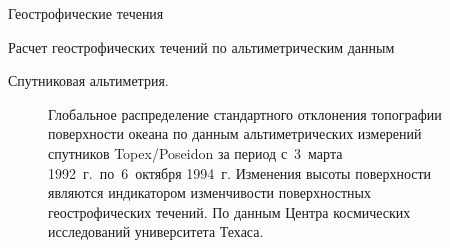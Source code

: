 \begin{chapter}{Геострофические течения}
\begin{section}{Расчет геострофических течений по альтиметрическим данным}
\begin{paragraph}{Спутниковая альтиметрия.}
\begin{figure}[t!]
\caption{Глобальное распределение стандартного отклонения топографии
поверхности океана по данным альтиметрических измерений
спутников Topex/Poseidon
за период с~3~марта 1992~г.\ по~6~октября 1994~г. 
Изменения высоты поверхности являются индикатором изменчивости поверхностных
геострофических течений. 
По данным Центра космических исследований университета Техаса.}
\label{fig:sshvariability}
\end{figure}
%


\end{paragraph}
\end{section}
\end{chapter}
